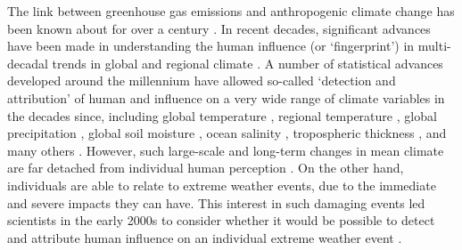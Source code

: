   The link between greenhouse gas emissions and anthropogenic climate change has been known about for over a century \citep{arrhenius_influence_1896}. In recent decades, significant advances have been made in understanding the human influence (or `fingerprint') in multi-decadal trends in global and regional climate \citep{bindoff_detection_2013,masson-delmotte_human_2021,stott_detection_2021}. A number of statistical advances developed around the millennium \citep{hasselmann_optimal_1993,hasselmann_multi-pattern_1997,allen_checking_1999,allen_estimating_2003,stott_estimating_2003} have allowed so-called `detection and attribution' of human and influence on a very wide range of climate variables in the decades since, including global temperature \citep{hegerl_multi-fingerprint_1997,stott_attribution_2001,gillett_constraining_2021}, regional temperature \citep{gillett_attribution_2008}, global precipitation \citep{bonfils_human_2020}, global soil moisture \citep{gu_attribution_2019}, ocean salinity \citep{stott_detection_2008}, tropospheric thickness \citep{christidis_changes_2015}, and many others \citep{masson-delmotte_human_2021}. However, such large-scale and long-term changes in mean climate are far detached from individual human perception \citep{pahl_perceptions_2014}. On the other hand, individuals are able to relate to extreme weather events, due to the immediate and severe impacts they can have. This interest in such damaging events led scientists in the early 2000s to consider whether it would be possible to detect and attribute human influence on an individual extreme weather event \citep{allen_liability_2003}.


